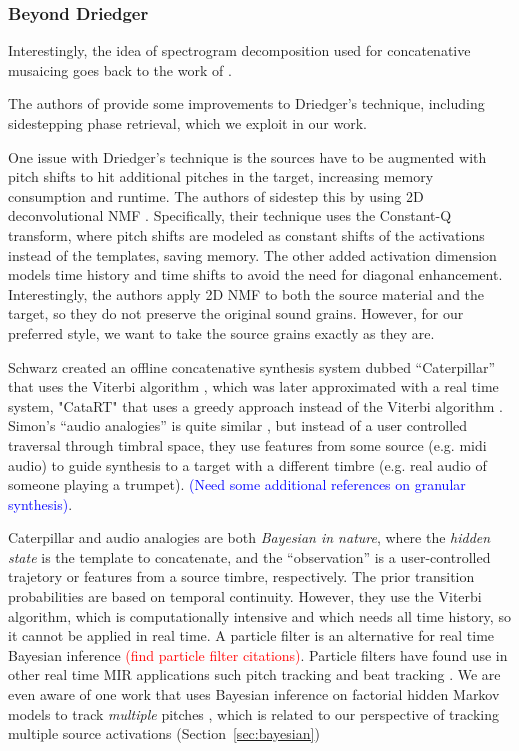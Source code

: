 \documentclass{article}
\newcommand{\ChrisEdit}[1]{\textcolor{red}{(#1)}}
\newcommand{\BenEdit}[1]{\textcolor{blue}{(#1)}}
\begin{document}
\subsubsection{Beyond Driedger}
Interestingly, the idea of spectrogram decomposition used for concatenative musaicing goes back to the work of \cite{burred2013cross}.

The authors of \cite{buch2017nichtnegativematrixfaktorisierungnutzendesklangsynthesensystem} provide some improvements to Driedger's technique, including sidestepping phase retrieval, which we exploit in our work.

One issue with Driedger's technique is the sources have to be augmented with pitch shifts to hit additional pitches in the target, increasing memory consumption and runtime.  The authors of \cite{foroughmand2017multi, aarabi2018music} sidestep this by using 2D deconvolutional NMF \cite{schmidt2006nonnegative}.  Specifically, their technique uses the Constant-Q transform, where pitch shifts are modeled as constant shifts of the activations instead of the templates, saving memory.  The other added activation dimension models time history and time shifts to avoid the need for diagonal enhancement.  Interestingly, the authors apply 2D NMF to both the source material and the target, so they do not preserve the original sound grains.  However, for our preferred style, we want to take the source grains exactly as they are.



Schwarz created an offline concatenative synthesis system dubbed ``Caterpillar'' that uses the Viterbi algorithm \cite{schwarz2000system}, which was later approximated with a real time system, "CataRT" that uses a greedy approach instead of the Viterbi algorithm \cite{schwarz2006real, schwarz2008principles}.  Simon's ``audio analogies'' is quite similar \cite{simon2005audio}, but instead of a user controlled traversal through timbral space, they use features from some source (e.g. midi audio) to guide synthesis to a target with a different timbre (e.g. real audio of someone playing a trumpet).  \BenEdit{Need some additional references on granular synthesis}.

Caterpillar and audio analogies are both {\em Bayesian in nature}, where the {\em hidden state} is the template to concatenate, and the ``observation'' is a user-controlled trajetory or features from a source timbre, respectively.  The prior transition probabilities are based on temporal continuity.  However, they use the Viterbi algorithm, which is computationally intensive and which needs all time history, so it cannot be applied in real time.  A particle filter is an alternative for real time Bayesian inference \ChrisEdit{find particle filter citations}.  Particle filters have found use in other real time MIR applications such pitch tracking \cite{duan2011state} and beat tracking \cite{heydari2021don}.  We are even aware of one work that uses Bayesian inference on factorial hidden Markov models to track {\em multiple} pitches \cite{wohlmayr2010probabilistic}, which is related to our perspective of tracking multiple source activations (Section~\ref{sec:bayesian})
\end{document}

